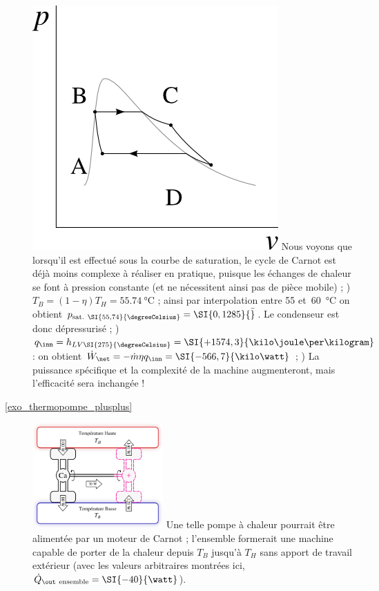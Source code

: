 \begin{description}
					\includegraphics[width=\solutiondiagramwidth]{images/exo_sol_pv_carnot_lv_2.png}
					Nous voyons que lorsqu’il est effectué sous la courbe de saturation, le cycle de Carnot est déjà moins complexe à réaliser en pratique, puisque les échanges de chaleur se font à pression constante (et ne nécessitent ainsi pas de pièce mobile)  ;
					) $T_B = (1 - \eta) T_H = \SI{55,74}{\degreeCelsius}$ ; ainsi par interpolation entre \num{55} et~\SI{60}{\degreeCelsius} on obtient $p_\text{sat. \SI{55,74}{\degreeCelsius}} = \SI{0,1285}{\bar}$. Le condenseur est donc dépressurisé  ;
					) $q_\inn = h_{LV\SI{275}{\degreeCelsius}} = \SI{+1574,3}{\kilo\joule\per\kilogram}$ : on obtient $\dot W_\net = -\dot m \eta q_\inn = \SI{-566,7}{\kilo\watt}$  ;
					) La puissance spécifique et la complexité de la machine augmenteront, mais l’efficacité sera inchangée !
		\item [\ref{exo_thermopompe_plusplus}]
					\includegraphics[width=5cm]{images/carnot_thermopompe_plusplus.png}
					\tab\tab Une telle pompe à chaleur pourrait être alimentée par un moteur de Carnot ; l’ensemble formerait une machine capable de porter de la chaleur depuis $T_B$ jusqu’à $T_H$ sans apport de travail extérieur (avec les valeurs arbitraires montrées ici, $\dot Q_{\out~\text{ensemble}} = \SI{-40}{\watt}$).

\end{description}
